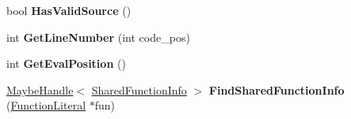 \begin{DoxyCompactItemize}
\item 
bool {\bfseries Has\+Valid\+Source} ()\hypertarget{classv8_1_1internal_1_1_script_a7c22c8144c6199dd74084d83354a57ea}{}\label{classv8_1_1internal_1_1_script_a7c22c8144c6199dd74084d83354a57ea}

\item 
int {\bfseries Get\+Line\+Number} (int code\+\_\+pos)\hypertarget{classv8_1_1internal_1_1_script_a112cba4bc4be05febf66068ac7aae26c}{}\label{classv8_1_1internal_1_1_script_a112cba4bc4be05febf66068ac7aae26c}

\item 
int {\bfseries Get\+Eval\+Position} ()\hypertarget{classv8_1_1internal_1_1_script_a97f047b8f9d7e133d4e7cb5ece6e1ab6}{}\label{classv8_1_1internal_1_1_script_a97f047b8f9d7e133d4e7cb5ece6e1ab6}

\item 
\hyperlink{classv8_1_1internal_1_1_maybe_handle}{Maybe\+Handle}$<$ \hyperlink{classv8_1_1internal_1_1_shared_function_info}{Shared\+Function\+Info} $>$ {\bfseries Find\+Shared\+Function\+Info} (\hyperlink{classv8_1_1internal_1_1_function_literal}{Function\+Literal} $\ast$fun)\hypertarget{classv8_1_1internal_1_1_script_a869d6561d9ac91ce90f24461a0297d9d}{}\label{classv8_1_1internal_1_1_script_a869d6561d9ac91ce90f24461a0297d9d}

\end{DoxyCompactItemize}

